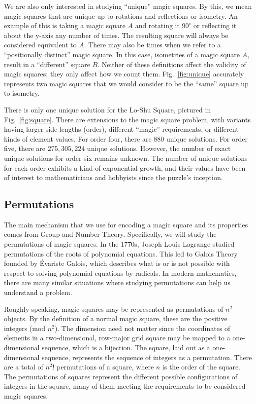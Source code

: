 \documentclass{rhumj_new}
\begin{document}
We are also only interested in studying ``unique'' magic squares. By this, we mean magic squares
that are unique up to rotations and reflections or isometry. An example of this is taking a magic
square $A$ and rotating it $90^{\circ }$ or reflecting it about the y-axis any number of times. The
resulting square will always be considered equivalent to $A$. There may also be times when we refer
to a ``positionally distinct'' magic square. In this case, isometries of a magic square $A$, result
in a ``different'' square $B$. Neither of these definitions affect the validity of magic squares;
they only affect how we count them. Fig.~\ref{fig:unique} accurately represents two magic squares
that we would consider to be the ``same'' square up to isometry.

There is only one unique solution for the Lo-Shu Square, pictured in Fig.~\ref{fig:square}. There
are extensions to the magic square problem, with variants having larger side lengths (order),
different ``magic'' requirements, or different kinds of element values. For order four, there are
$880$ unique solutions. For order five, there are $275,305,224$ unique solutions\cite{Fahimi}.
However, the number of exact unique solutions for order six remains unknown. The number of unique
solutions for each order exhibits a kind of exponential growth, and their values have been of
interest to mathematicians and hobbyists since the puzzle's inception.

\subsection{Permutations}

The main mechanism that we use for encoding a magic square and its properties comes from Group and
Number Theory. Specifically, we will study the permutations of magic squares. In the 1770s, Joseph
Louis Lagrange studied permutations of the roots of polynomial equations. This led to Galois Theory
founded by Évariste Galois, which describes what is or is not possible with respect to solving
polynomial equations by radicals\cite{Fraser}. In modern mathematics, there are many similar
situations where studying permutations can help us understand a problem.

Roughly speaking, magic squares may be represented as permutations of $n^2$ objects. By the
definition of a normal magic square, these are the positive integers (mod $n^2$). The dimension
need not matter since the coordinates of elements in a two-dimensional, row-major grid square may
be mapped to a one-dimensional sequence, which is a bijection. The square, laid out as a
one-dimensional sequence, represents the sequence of integers as a permutation. There are a total
of $n^{2}$! permutations of a square, where $n$ is the order of the square. The permutations of
squares represent the different possible configurations of integers in the square, many of them
meeting the requirements to be considered magic squares.
\end{document}
